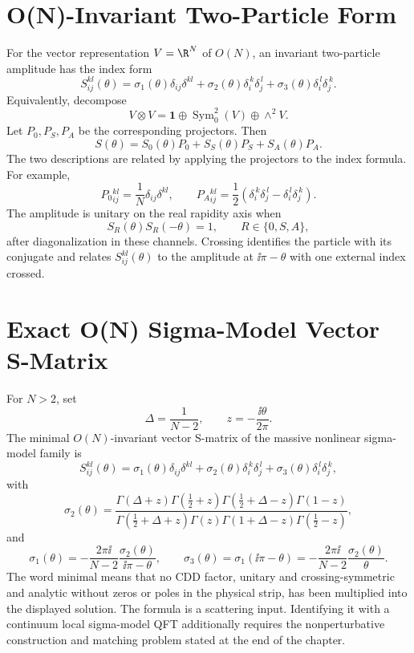 \section{O(N)-Invariant Two-Particle Form}

For the vector representation \(V=\R^N\) of \(O(N)\), an invariant
two-particle amplitude has the index form
\[
  S_{ij}^{kl}(\theta)
  =
  \sigma_1(\theta)\delta_{ij}\delta^{kl}
  +\sigma_2(\theta)\delta_i^{\,k}\delta_j^{\,l}
  +\sigma_3(\theta)\delta_i^{\,l}\delta_j^{\,k}.
\]
Equivalently, decompose
\[
  V\otimes V
  =
  \mathbf 1\oplus \operatorname{Sym}^2_0(V)\oplus \wedge^2V .
\]
Let \(P_0,P_S,P_A\) be the corresponding projectors.  Then
\[
  S(\theta)=S_0(\theta)P_0+S_S(\theta)P_S+S_A(\theta)P_A .
\]
The two descriptions are related by applying the projectors to the index
formula.  For example,
\[
  P_0{}_{ij}^{kl}=\frac1N\delta_{ij}\delta^{kl},\qquad
  P_A{}_{ij}^{kl}=\frac12(\delta_i^{\,k}\delta_j^{\,l}
  -\delta_i^{\,l}\delta_j^{\,k}).
\]
The amplitude is unitary on the real rapidity axis when
\[
  S_R(\theta)S_R(-\theta)=1,\qquad
  R\in\{0,S,A\},
\]
after diagonalization in these channels.  Crossing identifies the particle
with its conjugate and relates \(S_{ij}^{kl}(\theta)\) to the amplitude at
\(\ii\pi-\theta\) with one external index crossed.

\section{Exact O(N) Sigma-Model Vector S-Matrix}

For \(N>2\), set
\[
  \Delta=\frac1{N-2},
  \qquad
  z=-\frac{\ii\theta}{2\pi}.
\]
The minimal \(O(N)\)-invariant vector S-matrix of the massive nonlinear
sigma-model family is
\begin{equation}
  S_{ij}^{kl}(\theta)
  =
  \sigma_1(\theta)\delta_{ij}\delta^{kl}
  +\sigma_2(\theta)\delta_i^{\,k}\delta_j^{\,l}
  +\sigma_3(\theta)\delta_i^{\,l}\delta_j^{\,k},
  \label{eq:on-sigma-exact-smatrix-index}
\end{equation}
with
\begin{equation}
  \sigma_2(\theta)
  =
  \frac{
    \Gamma(\Delta+z)\Gamma(\frac12+z)
    \Gamma(\frac12+\Delta-z)\Gamma(1-z)}
  {
    \Gamma(\frac12+\Delta+z)\Gamma(z)
    \Gamma(1+\Delta-z)\Gamma(\frac12-z)}
  ,
  \label{eq:on-sigma-sigma2}
\end{equation}
and
\begin{equation}
  \sigma_1(\theta)
  =
  -\frac{2\pi\ii}{N-2}
  \frac{\sigma_2(\theta)}{\ii\pi-\theta},
  \qquad
  \sigma_3(\theta)=\sigma_1(\ii\pi-\theta)
  =
  -\frac{2\pi\ii}{N-2}
  \frac{\sigma_2(\theta)}{\theta}.
  \label{eq:on-sigma-sigma1-sigma3}
\end{equation}
The word minimal means that no CDD factor, unitary and crossing-symmetric and
analytic without zeros or poles in the physical strip, has been multiplied
into the displayed solution.  The formula is a scattering input.  Identifying
it with a continuum local sigma-model QFT additionally requires the
nonperturbative construction and matching problem stated at the end of the
chapter.

